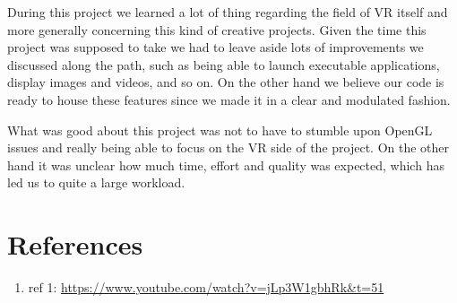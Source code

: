 \documentclass[paper=a4, fontsize=11pt]{scrartcl} %
\numberwithin{equation}{section} %
\numberwithin{figure}{section} %
\numberwithin{table}{section} %
\begin{document}
During this project we learned a lot of thing regarding the field of VR itself and more generally concerning this kind of creative projects. Given the time this project was supposed to take we had to leave aside lots of improvements we discussed along the path, such as being able to launch executable applications, display images and videos, and so on. On the other hand we believe our code is ready to house these features since we made it in a clear and modulated fashion.

What was good about this project was not to have to stumble upon OpenGL issues and really being able to focus on the VR side of the project. On the other hand it was unclear how much time, effort and quality was expected, which has led us to quite a large workload.


\section{References}
\label{sec:refs}
\begin{enumerate}
\item ref 1: \url{https://www.youtube.com/watch?v=jLp3W1gbhRk&t=51}
\end{enumerate}

\end{document}
